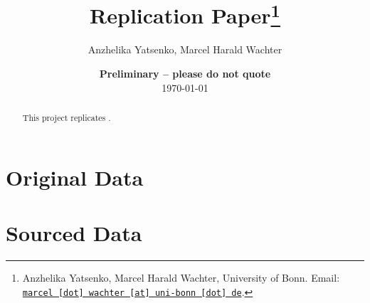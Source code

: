 \documentclass[11pt, a4paper, leqno]{article}
\begin{document}
\title{Replication Paper\thanks{Anzhelika Yatsenko, Marcel Harald Wachter, University of Bonn. Email: \href{mailto:marcel.wachter@uni-bonn.de}{\nolinkurl{marcel [dot] wachter [at] uni-bonn [dot] de}}.}}

\author{Anzhelika Yatsenko, Marcel Harald Wachter}

\date{
    {\bf Preliminary -- please do not quote}
    \\[1ex]
    \today
}

\maketitle


\begin{abstract}
    This project replicates \citep{Rose2004}.
\end{abstract}

\clearpage
\section{Original Data}




%
%


\clearpage
\section{Sourced Data}








 \clearpage

\printbibliography
{}


\end{document}
